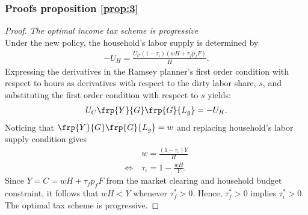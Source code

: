 \subsubsection{Proofs proposition \ref{prop:3}}\label{app:proofintegrated}
\begin{proof} \textit{The optimal income tax scheme is progressive}\\ %
	Under the new policy, the household's labor supply is determined by
	\begin{align}
	-U_H=\frac{U_C (1-\tau_{\iota})(wH+\tau_f p_fF)}{H}.
	\end{align}
	Expressing the derivatives in the Ramsey planner's first order condition with respect to hours as derivatives with respect to the dirty labor share, $s$, and substituting the first order condition with respect to $s$ yields:
	\begin{align}
	U_C \frp{Y}{G}\frp{G}{L_g}=-U_H.
	\end{align}
	Noticing that $\frp{Y}{G}\frp{G}{L_g}=w$ and replacing household's labor supply condition gives
	\begin{align}
	& w=\frac{(1-\tau_\iota)Y}{H}\\
	\Leftrightarrow\ & \tau_\iota=1-\frac{wH}{Y}. 
	\end{align} 
	Since $Y=C=wH+\tau_fp_fF$ from the market clearing and household budget constraint, it follows that $wH<Y$ whenever $\tau^*_f>0$. Hence, $\tau_f^*>0$ implies $\tau^*_{\iota}>0$.
	The optimal tax scheme is progressive.
\end{proof}

